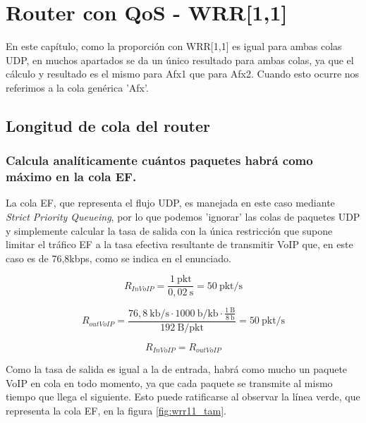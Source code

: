 \chapter{Router con QoS - WRR[1,1]}
\label{chap:conqoswrr11}

\tcolorbox[colback=yellow!20, colframe=yellow!50!black, title=Nota]
En este capítulo, como la proporción con WRR[1,1] es igual para ambas colas UDP, en muchos apartados
se da un único resultado para ambas colas, ya que el cálculo y resultado es el mismo para Afx1 que para 
Afx2. Cuando esto ocurre nos referimos a la cola genérica 'Afx'.
\endtcolorbox

\section{Longitud de cola del router}

\subsection{Calcula analíticamente cuántos paquetes habrá como máximo en la cola EF.}

\renewcommand{\theenumi}{\alph{enumi}}

La cola EF, que representa el flujo UDP, es manejada en este caso mediante \textit{Strict Priority Queueing},
por lo que podemos 'ignorar' las colas de paquetes UDP y simplemente calcular la tasa de salida con la
única restricción que supone limitar el tráfico EF a la tasa efectiva resultante de transmitir VoIP que, 
en este caso es de 76,8kbps, como se indica en el enunciado.


\[
R_{InVoIP} = \frac{1~\text{pkt}}{0,02~\text{s}} = 50 ~ \text{pkt/s}
\]

\[
R_{outVoIP} = \frac{76,8~\text{kb/s} \cdot 1000~\text{b/kb} \cdot \frac{1~\text{B}}{8~\text{b}}}{ 192~\text{B/pkt}} = 50~\text{pkt/s}
\]

\[
R_{InVoIP} = R_{outVoIP}
\]

Como la tasa de salida es igual a la de entrada, habrá como mucho un paquete VoIP en
cola en todo momento, ya que cada paquete se transmite al mismo tiempo que llega el siguiente.
Esto puede ratificarse al observar la línea verde, que representa la cola EF, en la figura \ref{fig:wrr11_tam}.

